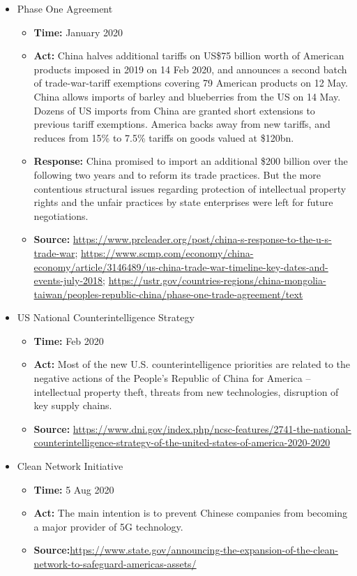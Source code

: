 \begin{itemize}
			\item Phase One Agreement
				\begin{itemize}
				\item \textbf{Time: }January 2020
				\item \textbf{Act: } China halves additional tariffs on US\$75 billion worth of American products imposed in 2019 on 14 Feb 2020, and announces a second batch of trade-war-tariff exemptions covering 79 American products on 12 May. China allows imports of barley and blueberries from the US on 14 May. Dozens of US imports from China are granted short extensions to previous tariff exemptions. America backs away from new tariffs, and reduces from 15\% to 7.5\% tariffs on goods valued at \$120bn.
				\item \textbf{Response: } China promised to import an additional \$200 billion over the following two years and to reform its trade practices. But the more contentious structural issues regarding protection of intellectual property rights and the unfair practices by state enterprises were left for future negotiations.
				\item	\textbf{Source: }\url{https://www.prcleader.org/post/china-s-response-to-the-u-s-trade-war}; \url{https://www.scmp.com/economy/china-economy/article/3146489/us-china-trade-war-timeline-key-dates-and-events-july-2018}; \url{https://ustr.gov/countries-regions/china-mongolia-taiwan/peoples-republic-china/phase-one-trade-agreement/text}
				\end{itemize}
				
			\item US National Counterintelligence Strategy
				\begin{itemize}
				\item \textbf{Time: } Feb 2020
				\item \textbf{Act: }Most of the new U.S. counterintelligence priorities are related to the negative actions of the People’s Republic of China for America – intellectual property theft, threats from new technologies, disruption of key supply chains.
				\item \textbf{Source:} \url{https://www.dni.gov/index.php/ncsc-features/2741-the-national-counterintelligence-strategy-of-the-united-states-of-america-2020-2020}
				\end{itemize}
			
			\item Clean Network Initiative
				\begin{itemize}
				\item \textbf{Time:} 5 Aug 2020
				\item \textbf{Act:} The main intention is to prevent Chinese companies from becoming a major provider of 5G technology.
				\item \textbf{Source:}\url{https://www.state.gov/announcing-the-expansion-of-the-clean-network-to-safeguard-americas-assets/}
				\end{itemize}
				

\end{itemize}
